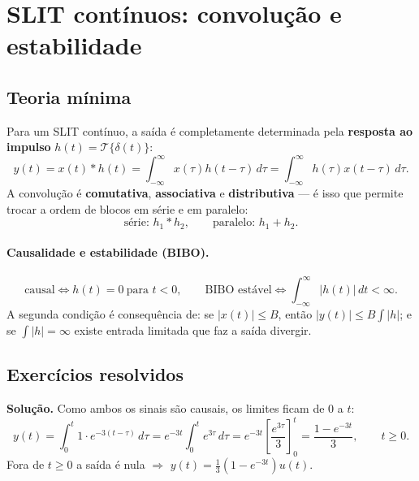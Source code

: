 \section{SLIT contínuos: convolução e estabilidade}\label{sec:slit}

\subsection*{Teoria mínima}

Para um SLIT contínuo, a saída é completamente determinada pela
\textbf{resposta ao impulso} $h(t)=\mathcal{T}\{\delta(t)\}$:
\[
  y(t)=x(t)*h(t)=\int_{-\infty}^{\infty}x(\tau)h(t-\tau)\,d\tau
      =\int_{-\infty}^{\infty}h(\tau)x(t-\tau)\,d\tau .
\]
A convolução é \textbf{comutativa}, \textbf{associativa} e
\textbf{distributiva} — é isso que permite trocar a ordem de blocos em série e
em paralelo:
\[
  \text{série: }h_1*h_2, \qquad \text{paralelo: }h_1+h_2 .
\]

\paragraph{Causalidade e estabilidade (BIBO).}
\[
  \text{causal}\iff h(t)=0\ \text{para }t<0, \qquad
  \text{BIBO estável}\iff \int_{-\infty}^{\infty}|h(t)|\,dt<\infty .
\]
A segunda condição é consequência de: se $|x(t)|\le B$, então
$|y(t)|\le B\int|h|$; e se $\int|h|=\infty$ existe entrada limitada que faz a
saída divergir.


\subsection*{Exercícios resolvidos}


\textbf{Solução.} Como ambos os sinais são causais, os limites ficam de $0$ a
$t$:
\[
  y(t)=\int_{0}^{t}1\cdot e^{-3(t-\tau)}\,d\tau
       =e^{-3t}\int_0^t e^{3\tau}\,d\tau
       =e^{-3t}\left[\frac{e^{3\tau}}{3}\right]_0^t
       =\frac{1-e^{-3t}}{3},\qquad t\ge 0 .
\]
Fora de $t\ge 0$ a saída é nula $\Rightarrow$ $y(t)=\frac{1}{3}(1-e^{-3t})u(t)$.

